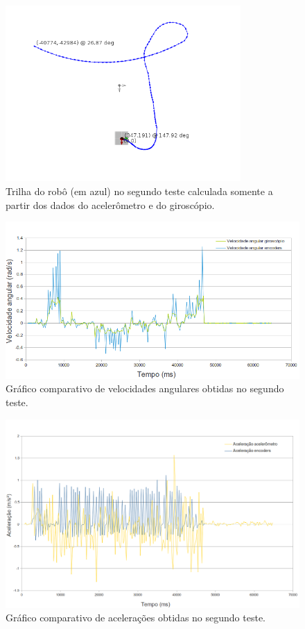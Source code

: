 \begin{figure}[H]
	\centering
	\includegraphics[width=0.8\textwidth]{./figuras/testes/teste2/mapa_acelerometro.png}
	\caption{Trilha do robô (em azul) no segundo teste calculada somente a partir dos dados do acelerômetro e do giroscópio.}
	\label{fig:teste2_mapa_acelerometro}
\end{figure}

\begin{figure}[H]
	\centering
	\includegraphics[width=1\textwidth]{./figuras/testes/teste2/grafico_giro.png}
	\caption{Gráfico comparativo de velocidades angulares obtidas no segundo teste.}
	\label{fig:teste2_giro_grafico}
\end{figure}

\begin{figure}[H]
	\centering
	\includegraphics[width=1\textwidth]{./figuras/testes/teste2/grafico_acel.png}
	\caption{Gráfico comparativo de acelerações obtidas no segundo teste.}
	\label{fig:teste2_acel_grafico}
\end{figure}

